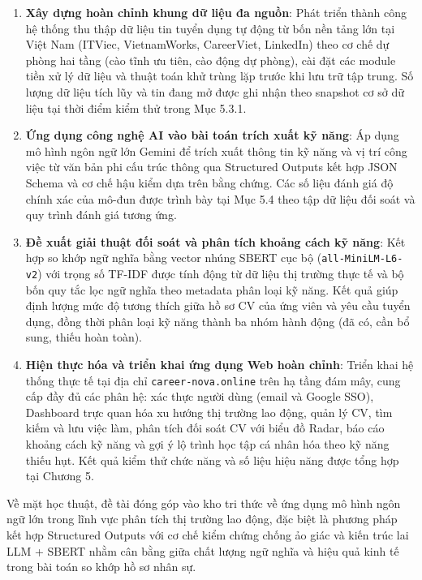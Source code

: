 \begin{enumerate}
    \item \textbf{Xây dựng hoàn chỉnh khung dữ liệu đa nguồn}: Phát triển thành công hệ thống thu thập dữ liệu tin tuyển dụng tự động từ bốn nền tảng lớn tại Việt Nam (ITViec, VietnamWorks, CareerViet, LinkedIn) theo cơ chế dự phòng hai tầng (cào tĩnh ưu tiên, cào động dự phòng), cài đặt các module tiền xử lý dữ liệu và thuật toán khử trùng lặp trước khi lưu trữ tập trung. Số lượng dữ liệu tích lũy và tin đang mở được ghi nhận theo snapshot cơ sở dữ liệu tại thời điểm kiểm thử trong Mục 5.3.1.

    \item \textbf{Ứng dụng công nghệ AI vào bài toán trích xuất kỹ năng}: Áp dụng mô hình ngôn ngữ lớn Gemini để trích xuất thông tin kỹ năng và vị trí công việc từ văn bản phi cấu trúc thông qua Structured Outputs kết hợp JSON Schema và cơ chế hậu kiểm dựa trên bằng chứng. Các số liệu đánh giá độ chính xác của mô-đun được trình bày tại Mục 5.4 theo tập dữ liệu đối soát và quy trình đánh giá tương ứng.

    \item \textbf{Đề xuất giải thuật đối soát và phân tích khoảng cách kỹ năng}: Kết hợp so khớp ngữ nghĩa bằng vector nhúng SBERT cục bộ (\texttt{all-MiniLM-L6-v2}) với trọng số TF-IDF được tính động từ dữ liệu thị trường thực tế và bộ bốn quy tắc lọc ngữ nghĩa theo metadata phân loại kỹ năng. Kết quả giúp định lượng mức độ tương thích giữa hồ sơ CV của ứng viên và yêu cầu tuyển dụng, đồng thời phân loại kỹ năng thành ba nhóm hành động (đã có, cần bổ sung, thiếu hoàn toàn).

    \item \textbf{Hiện thực hóa và triển khai ứng dụng Web hoàn chỉnh}: Triển khai hệ thống thực tế tại địa chỉ \texttt{career-nova.online} trên hạ tầng đám mây, cung cấp đầy đủ các phân hệ: xác thực người dùng (email và Google SSO), Dashboard trực quan hóa xu hướng thị trường lao động, quản lý CV, tìm kiếm và lưu việc làm, phân tích đối soát CV với biểu đồ Radar, báo cáo khoảng cách kỹ năng và gợi ý lộ trình học tập cá nhân hóa theo kỹ năng thiếu hụt. Kết quả kiểm thử chức năng và số liệu hiệu năng được tổng hợp tại Chương 5.
\end{enumerate}

Về mặt học thuật, đề tài đóng góp vào kho tri thức về ứng dụng mô hình ngôn ngữ lớn trong lĩnh vực phân tích thị trường lao động, đặc biệt là phương pháp kết hợp Structured Outputs với cơ chế kiểm chứng chống ảo giác và kiến trúc lai LLM + SBERT nhằm cân bằng giữa chất lượng ngữ nghĩa và hiệu quả kinh tế trong bài toán so khớp hồ sơ nhân sự.


